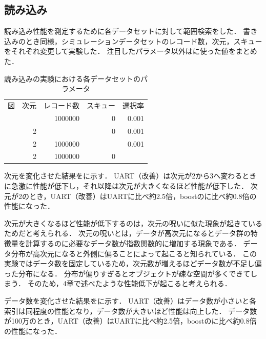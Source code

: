 \subsection{読み込み}

読み込み性能を測定するために各データセットに対して範囲検索をした．
書き込みのとき同様，シミュレーションデータセットのレコード数，次元，スキューをそれぞれ変更して実験した．
注目したパラメータ以外は\Tab{\ref{tab:scan}}に使った値をまとめた．
\begin{table}[tb]
  \caption{読み込みの実験における各データセットのパラメータ}
  \label{tab:scan}
  \centering \small
  \begin{tabular}{lrrrr}
    \toprule
    図                               & 次元 & レコード数 & スキュー & 選択率 \\
    \cmidrule(lr){1-1}
    \cmidrule(lr){2-2}
    \cmidrule(lr){3-3}
    \cmidrule(lr){4-4}
    \cmidrule(lr){5-5}
    \Fig{\ref{graph:dim-sc}}         & \-   & 1000000    & 0        & 0.001  \\
    \Fig{\ref{graph:rec-sc}}         & 2    & \-         & 0        & 0.001  \\
    \Fig{\ref{graph:skew-sc}}        & 2    & 1000000    & \-       & 0.001  \\
    \Fig{\ref{graph:selectivity-sc}} & 2    & 1000000    & 0        & \-     \\
    \bottomrule
  \end{tabular}
\end{table}

次元を変化させた結果を\Fig{\ref{graph:dim-sc}}に示す．
UART（改善）は次元が2から3へ変わるときに急激に性能が低下し，それ以降は次元が大きくなるほど性能が低下した．
次元が2のとき，UART（改善）はUARTに比べ約2.5倍，boostの\RTree に比べ約0.8倍の性能になった．


次元が大きくなるほど性能が低下するのは，次元の呪いに似た現象が起きているためだと考えられる．
次元の呪いとは，データが高次元になるとデータ群の特徴量を計算するのに必要なデータ数が指数関数的に増加する現象である．
データ分布が高次元になると外側に偏ることによって起こると知られている．
この実験ではデータ数を固定しているため，次元数が増えるほどデータ数が不足し偏った分布になる．
分布が偏りすぎるとオブジェクトが疎な空間が多くできてしまう．
そのため，4章で述べたような性能低下が起こると考えられる．

データ数を変化させた結果を\Fig{\ref{graph:rec-sc}}に示す．
UART（改善）はデータ数が小さいと各索引は同程度の性能となり，データ数が大きいほど性能は向上した．
データ数が100万のとき，UART（改善）はUARTに比べ約2.5倍，boostの\RTree に比べ約0.8倍の性能になった．

